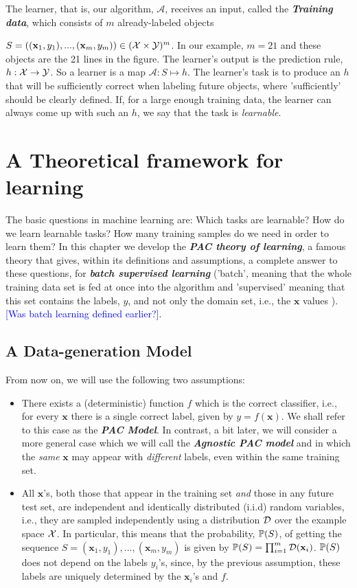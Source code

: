 The learner, that is, our algorithm, $\mathcal{A}$, receives an input, called the \textit{\textbf{Training data}},  which consists of $m$ already-labeled objects {$S=((\mathbf{x}_1,y_1),...,(\mathbf{x}_m,y_m)) \in  (\mathcal{X}\times \mathcal{Y})^m$. In our example, $m=21$ and these objects are the 21 lines in the figure. The learner's output is the prediction rule, $h:\mathcal{X}\to \mathcal{Y}$. So a learner is a map $\mathcal{A}:S\mapsto h$. 
The learner's task is to produce an $h$ that will be sufficiently correct when labeling future objects, where  'sufficiently' should be clearly defined. If, for a large enough training data, the learner can always come up with such an $h$, we say that the task is \textit{learnable}.


\section{A Theoretical framework for learning}

The basic questions in machine learning are: Which tasks are learnable?  
How do we learn learnable tasks? How many training samples do we need in order to learn them? 
In this chapter we develop the \textit{\textbf{ PAC theory of learning}}, a famous theory that gives, within its definitions and assumptions, a complete answer to these questions,  for \textit{\textbf{ batch supervised learning}} ('batch', meaning that the whole training data set is fed at once into the algorithm and 'supervised' meaning that this set contains the labels, $y$, and not only the domain set, i.e., the $\mathbf{x}$ values ). \textcolor{blue}{[Was batch learning defined earlier?]}.

\subsection{A Data-generation Model }
From now on, we will use the following two assumptions:
\begin{itemize}
	\item There exists a (deterministic) function $f$ which is the correct classifier, i.e., for every $\mathbf{x}$ there is a single correct label, given by $y=f(\mathbf{x})$. We shall refer to this case as the \textit{\textbf{PAC Model}}.  In contrast, a bit later, we will consider a more general case which we will call the \textit{\textbf{Agnostic PAC model}} and in which the \textit{same} $\mathbf{x}$ may appear with \textit{different} labels, even within the same training set.
	
	
	\item All $\mathbf{x}$'s, both those that appear in the training set \textit{and} those in any future test set,  are independent and identically distributed (i.i.d) random variables, i.e., they are sampled independently using a distribution $\mathcal{D}$ over the example space $\mathcal{X}$. In particular, this means that the probability, $\mathbb{P}(S)$, of getting the sequence  $S=(\mathbf{x}_1,y_1),...,(\mathbf{x}_m,y_m)$ is given by $\mathbb{P}(S)=\prod_{i=1}^{m}\mathcal{D}(\mathbf{x}_i)$.   $\mathbb{P}(S)$ does not  depend on the labels $y_i$'s, since, by the previous assumption, these labels are uniquely determined by the $\mathbf{x}_i$'s and $f$. 
\end{itemize}




}
